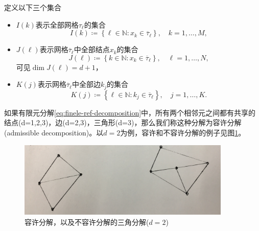 定义以下三个集合
\begin{itemize}
  \item $I(k)$表示全部网格$\tau_{\ell}$的集合
  \begin{equation*}
    I(k) \coloneqq \left\{ \ell \in \mathbb{N}: x_{k} \in \overline{\tau}_{\ell} \right\}, \quad k = 1, \ldots, M,
  \end{equation*}
  \item $J(\ell)$表示网格$\overline{\tau}_{\ell}$中全部结点$x_{k}$的集合
  \begin{equation*}
    J(\ell) \coloneqq \left\{ k \in \mathbb{N}: x_{k} \in \overline{\tau}_{\ell} \right\}, \quad \ell = 1, \ldots, N,
  \end{equation*}
  可见$\dim J(\ell) = d+1$，
  \item $K(j)$表示网格$\overline{\tau}_{\ell}$中全部边$k_{j}$的集合
  \begin{equation*}
    K(j) \coloneqq \left\{ \ell \in \mathbb{N} : k_{j} \in \overline{\tau}_{\ell} \right\}, \quad j = 1, \ldots, K.
  \end{equation*}
\end{itemize}

如果有限元分解\eqref{eq:finele-ref-decomposition}中，所有两个相邻元之间都有共享的结点(d=1,2,3)，边(d=2,3)，三角形(d=3)，那么我们称这种分解为容许分解(admissible decomposition)。以$d=2$为例，容许和不容许分解的例子见图\ref{fig:finele-ref-decomp-admissible-example}。
\begin{figure}[htbp]
  \centering
  \includegraphics[width=4in]{./Figures/20171209-decompo-adm-inadm.jpg}
 \caption{容许分解，以及不容许分解的三角分解($d=2$)}
\label{fig:finele-ref-decomp-admissible-example}

\end{figure}

